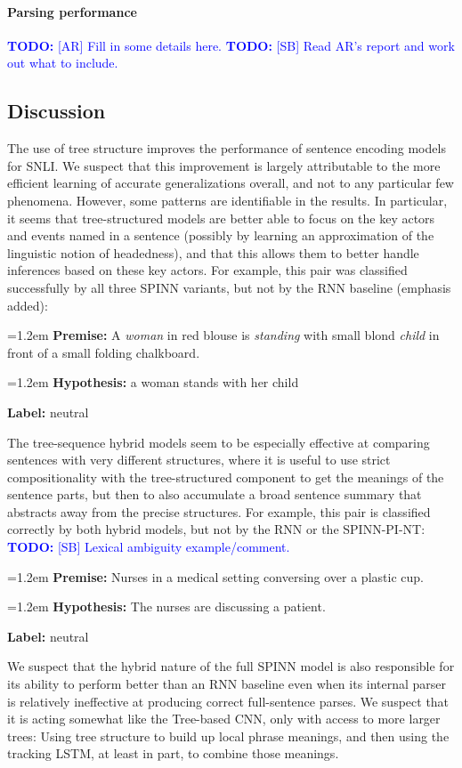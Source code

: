 \documentclass[11pt]{article}
\newcommand\todo[1]{\textcolor{blue}{\textbf{TODO:} #1}}
\newcommand{\snli}[3]{{\vspace{0.25em}
{\small \setlength{\parindent}{0.6em} \hangindent=1.2em  \textbf{Premise:} #1\par}\vspace{0.25em}
{\small \setlength{\parindent}{0.6em} \hangindent=1.2em   \textbf{Hypothesis:} #2\par}\vspace{0.25em}
{\small \setlength{\parindent}{0.6em}  \textbf{Label:} #3\par}
}}
\begin{document}
\paragraph{Parsing performance}

\todo{[AR] Fill in some details here.}
\todo{[SB] Read AR's report and work out what to include.}

\subsection{Discussion}

The use of tree structure improves the performance of sentence encoding models for SNLI. We suspect that this improvement is largely attributable to the more efficient learning of accurate generalizations overall, and not to any particular few phenomena. However, some patterns are identifiable in the results. In particular, it seems that tree-structured models are better able to focus on the key actors and events named in a sentence (possibly by learning an approximation of the linguistic notion of headedness), and that this allows them to better handle inferences based on these key actors. For example, this pair was classified successfully by all three SPINN variants, but not by the RNN baseline (emphasis added):

\snli
{A \textit{woman} in red blouse is \textit{standing} with small blond \textit{child} in front of a small folding chalkboard.}
{a woman stands with her child}
{neutral}

The tree-sequence hybrid models seem to be especially effective at comparing sentences with very different structures, where it is useful to use strict compositionality with the tree-structured component to get the meanings of the sentence parts, but then to also accumulate a broad sentence summary that abstracts away from the precise structures. For example, this pair is classified correctly by both hybrid models, but not by the RNN or the SPINN-PI-NT: \todo{[SB] Lexical ambiguity example/comment.}

\snli{Nurses in a medical setting conversing over a plastic cup.}
{The nurses are discussing a patient.}
{neutral}

We suspect that the hybrid nature of the full SPINN model is also responsible for its ability to perform better than an RNN baseline even when its internal parser is relatively ineffective at producing correct full-sentence parses. We suspect that it is acting somewhat like the Tree-based CNN, only with access to more larger trees: Using tree structure to build up local phrase meanings, and then using the tracking LSTM, at least in part, to combine those meanings.
\end{document}
